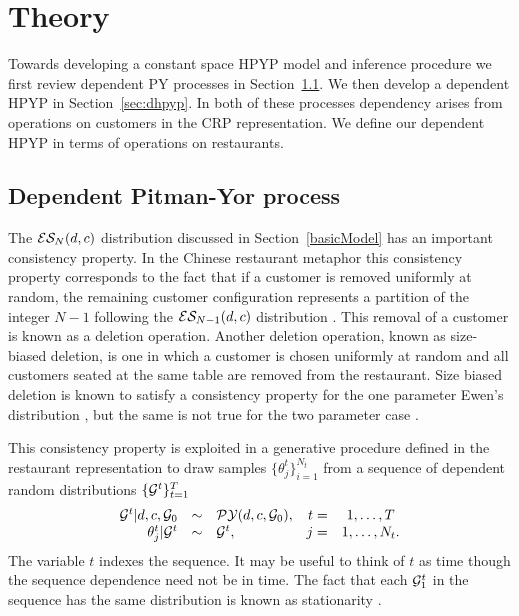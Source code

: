 \section{Theory}
\label{sec:theory}

Towards developing a constant space HPYP model and inference procedure we first review dependent PY processes in Section~\ref{sec:dpyp}.  We then develop a dependent HPYP in Section~\ref{sec:dhpyp}. In both of these processes dependency arises from operations on customers in the CRP representation. We define our dependent HPYP in terms of operations on restaurants.


\subsection{Dependent Pitman-Yor process} 
\label{sec:dpyp}

The $\ES_N(d,c)$ distribution discussed in Section~\ref{basicModel} has an important consistency property. In the Chinese restaurant metaphor this consistency property corresponds to the fact that if a customer is removed uniformly at random, the remaining customer configuration represents a partition of the integer $N-1$ following the $\ES_{N-1}(d,c)$ distribution \cite{Pitman1995}.  This removal of a customer is known as a deletion operation.  Another deletion operation, known as size-biased deletion, is one in which a customer is chosen uniformly at random and all customers seated at the same table are removed from the restaurant. Size biased deletion is known to satisfy a consistency property for the one parameter Ewen's distribution \cite{Kingman1978}, but the same is not true for the two parameter case \cite{Pitman1995}.

This consistency property is exploited in a generative procedure defined in the restaurant representation to draw samples  $\{ \theta_j^t \}_{i = 1}^{N_t}$ from a sequence of dependent random distributions $\{ \G^t \}_{t=1}^T$ 
%
\begin{equation}
\begin{array}{rclrcr}
\G^t | d, c, \G_0 &\sim& \PY(d,c,\G_0),  & t =&1, \dots, T\\
 \label{eqnDependentPY2}  \theta_j^t | \G^t &\sim& \G^t, & j =&1, \dots ,N_t.
 \end{array}
 \end{equation}
The variable $t$ indexes the sequence.  It may be useful to think of $t$ as time though the sequence dependence need not be in time. The fact that each $\G^t_1$ in the sequence has the same distribution is known as stationarity \cite{Brockwell1991}.  
 

